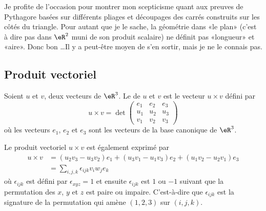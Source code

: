 Je profite de l'occasion pour montrer mon scepticisme quant aux preuves de Pythagore basées sur différents pliages et découpages des carrés construits sur les côtés du triangle. Pour autant que je le sache, la géométrie dans «le plan» (c'est à dire pas dans \( \eR^2\) muni de son produit scalaire) ne définit pas «longueur» et «aire». Donc bon \ldots Il y a peut-être moyen de s'en sortir, mais je ne le connais pas.

\subsection{Produit vectoriel}

\begin{definition}      \label{DEFooTNTNooRjhuJZ}
	Soient $u$ et $v$, deux vecteurs de $\eR^3$. Le  de $u$ et $v$ est le vecteur $u\times v$ défini par
    \begin{equation}        \label{EQooCUJRooFuFPaZ}
		u\times v=\det\begin{pmatrix}
			e_1	&	e_2	&	e_3	\\
			u_1	&	u_2	&	u_3	\\
			v_1	&	v_2	&	v_3
		\end{pmatrix}
    \end{equation}
	où les vecteurs $e_1$, $e_2$ et $e_3$ sont les vecteurs de la base canonique de $\eR^3$.
\end{definition}

\begin{lemma}
    Le produit vectoriel \( u\times v\) est également exprimé par
    \begin{subequations}
        \begin{align}
            u\times v&=(u_2v_3-u_3v_2)e_1+(u_3v_1-u_1v_3)e_2+(u_1v_2-u_2v_1)e_3     \label{SEBEQooVROKooRpUOIr}\\
                &=\sum_{i,j,k}\epsilon_{ijk}v_iw_je_k
        \end{align}
    \end{subequations}
    où $\epsilon_{ijk}$ est défini par $\epsilon_{xyz}=1$ et ensuite $\epsilon_{ijk}$ est $1$ ou $-1$ suivant que la permutation des $x$, $y$ et $z$ est paire ou impaire. C'est-à-dire que \( \epsilon_{ijk}\) est la signature de la permutation qui amène \( (1,2,3)\) sur \( (i,j,k)\).
\end{lemma}

